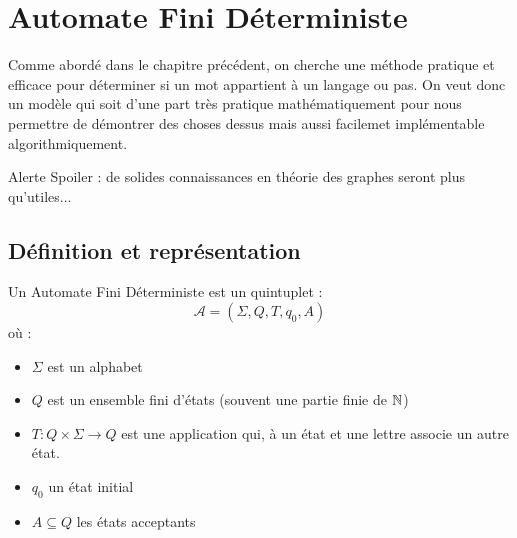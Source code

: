 \chapter{Automate Fini Déterministe}

\minitoc %

\setlength{\parindent}{0pt}
\renewcommand{\labelitemi}{\textbullet} %



Comme abordé dans le chapitre précédent, on cherche une méthode pratique et efficace pour déterminer si un mot appartient 
à un langage ou pas. On veut donc un modèle qui soit d'une part très pratique mathématiquement pour nous permettre de 
démontrer des choses dessus mais aussi facilemet implémentable algorithmiquement. 

Alerte Spoiler : de solides connaissances en théorie des graphes seront plus qu'utiles...



\section{Définition et représentation}

\begin{definition}
    Un Automate Fini Déterministe est un quintuplet :
        \[ \boxed{ \mathcal{A} = (\Sigma, Q, T, q_0, A) } \] 
    où :
    \begin{itemize}
        \item $\Sigma$ est un alphabet 
        \item $Q$ est un ensemble fini d'états (souvent une partie finie de $\mathbb{N}$)
        \item $T : Q \times \Sigma \longrightarrow Q$ est une application qui, à un état et une lettre associe un autre état. 
        \item $q_0$ un état initial
        \item $A \subseteq Q$ les états acceptants
    \end{itemize}
\end{definition}

